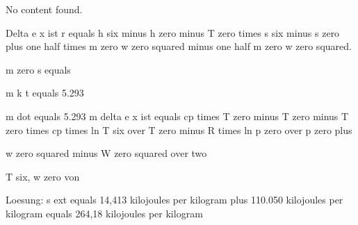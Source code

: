 No content found.

Delta e x ist r equals h six minus h zero minus T zero times s six minus s zero plus one half times m zero w zero squared minus one half m zero w zero squared.

m zero s equals

m k t equals 5.293

m dot equals 5.293 m delta e x ist equals cp times T zero minus T zero minus T zero times cp times ln T six over T zero minus R times ln p zero over p zero plus

w zero squared minus W zero squared over two

T six, w zero von

Loesung: s ext equals 14,413 kilojoules per kilogram plus 110.050 kilojoules per kilogram equals 264,18 kilojoules per kilogram